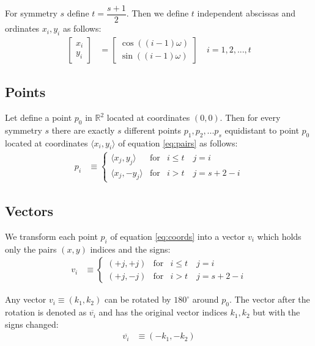 \documentclass[11pt]{article}
\begin{document}
For symmetry $s$ define $t = \dfrac{s+1}2$. Then we define $t$ independent abscissas and ordinates $x_i, y_i$ as follows:
\begin{align}
\left[ \begin{array}{c} x_i \\ y_i \end{array} \right] &= 
\left[ \begin{array}{c} \cos((i-1)\omega) \\ \sin((i-1)\omega) \end{array} \right]
 \quad i = 1,2,...,t \label{eq:pairs}
\end{align}

\subsection{Points}

Let define a point $p_0$ in $\mathbb{R}^2$ located at coordinates $(0,0)$. Then for every symmetry $s$ there are exactly $s$ different points $p_1, p_2, ... p_s$  equidistant to point $p_0$ located at coordinates $\langle x_i,y_i \rangle$ of equation \ref{eq:pairs} as follows:
\begin{align}
p_i &\equiv \left\{ \begin{array}{ccl}
 \langle x_j,y_j\rangle & \mbox{for} & i \leq t  \quad j = i\\
 \langle x_j, -y_j\rangle & \mbox{for} & i > t \quad j = s+2-i
 \end{array}\right. \label{eq:coords}
\end{align}

\subsection{Vectors}

We transform each point $p_i$ of equation \ref{eq:coords} into a vector $v_i$ which holds only the pairs $(x,y)$ indices and the signs:
\begin{align}
v_i &\equiv \left\{ \begin{array}{ccl}
 ( +j, +j ) & \mbox{for} & i \leq t \quad j = i\\
 ( +j, -j ) & \mbox{for} & i > t \quad j = s+2-i
 \end{array}\right. \label{eq:vectors}
\end{align}

Any vector $v_i \equiv (k_1,k_2)$ can be rotated by $180^\circ$ around $p_0$. The vector after the rotation is denoted as $\overline{v_i}$ and has the original vector indices $k_1,k_2$ but with the signs changed:
\begin{align}
\overline{v_i} &\equiv (-k_1, -k_2) \label{eq:vector180}
\end{align}
\end{document}
